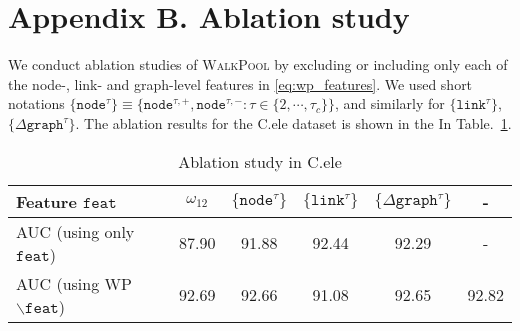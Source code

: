 \documentclass[11pt]{article}
\newcommand{\walkpool}{\textsc{WalkPool}\xspace}
\newcommand{\ra}[1]{\renewcommand{\arraystretch}{#1}}
\begin{document}
\addtolength{\tabcolsep}{-3pt}
\begin{table}[!]
\centering
\setlength{\tabcolsep}{3.3pt}
\ra{1.2}
    \caption{Benchmark dataset properties and statistics.}
\label{dataset}
\vspace{-5mm}
\end{table}
\addtolength{\tabcolsep}{3pt}

\section*{Appendix B. Ablation study}
We conduct ablation studies of \walkpool by excluding or including only each of the node-, link- and graph-level features in \eqref{eq:wp_features}. We used short notations
$\{\mathtt{node}^{\tau}\}\equiv\{\mathtt{node}^{\tau,+},\mathtt{node}^{\tau,-}:\tau\in\{2,\cdots,\tau_c\}\}$, and similarly for $\{\mathtt{link}^{\tau}\}$, $\{\Delta \mathtt{graph}^{\tau}\}$. The ablation results for the C.ele dataset is shown in the In Table.~\ref{tab:appendixa}. 

\begin{table}[h]
\centering
\ra{1}
\begin{tabular}{@{}lccccc@{}}
\toprule
    Feature $\mathtt{feat}$&  $\omega_{12}$ & $\{\mathtt{node}^{\tau}\}$ &$\{\mathtt{link}^{\tau}\}$& $\{\Delta \mathtt{graph}^{\tau}\}$     & - \\ \midrule
    AUC (using only $\mathtt{feat}$)     &87.90& 91.88&92.44&92.29         & -\\
      
    AUC (using WP$\backslash \mathtt{feat}$)     &92.69            &92.66          & 91.08        & 92.65                &92.82\\
\bottomrule
\end{tabular}
\caption{Ablation study in C.ele}
\label{tab:appendixa}
\end{table}
        
\end{document}
